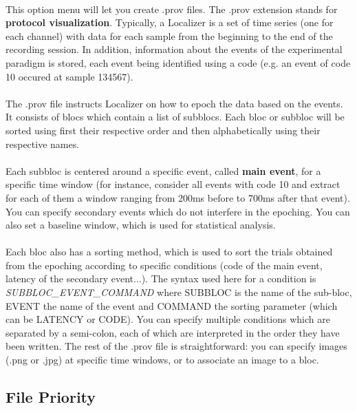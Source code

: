 \documentclass[a4paper]{article}
\begin{document}
\paragraph{} This option menu will let you create .prov files. The .prov extension stands for \textbf{protocol visualization}. Typically, a Localizer is a set of time series (one for each channel) with data for each sample from the beginning to the end of the recording session. In addition,  information about the events of the experimental paradigm is stored, each event being identified using a code (e.g. an event of code 10 occured at sample 134567).
\paragraph{} The .prov file instructs Localizer on how to epoch the data based on the events. It consists of blocs which contain a list of subblocs. Each bloc or subbloc will be sorted using first their respective order and then alphabetically using their respective names.
\paragraph{} Each subbloc is centered around a specific event, called \textbf{main event}, for a specific time window (for instance, consider all events with code 10 and extract for each of them a window ranging from 200ms before to 700ms after that event). You can specify secondary events which do not interfere in the epoching. You can also set a baseline window, which is used for statistical analysis.
\paragraph{} Each bloc also has a sorting method, which is used to sort the trials obtained from the epoching according to specific conditions (code of the main event, latency of the secondary event...). The syntax used here for a condition is \textit{SUBBLOC{\_}EVENT{\_}COMMAND} where SUBBLOC is the name of the sub-bloc, EVENT the name of the event and COMMAND the sorting parameter (which can be LATENCY or CODE). You can specify multiple conditions which are separated by a semi-colon, each of which are interpreted in the order they have been written. The rest of the .prov file is straightforward: you can specify images (.png or .jpg) at specific time windows, or to associate an image to a bloc. 
\subsection{File Priority}
\end{document}
